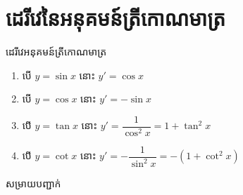 \documentclass[12pt,fleqn]{book} %
\newcommand{\solution}{{\begin{center}\kml \color{magenta} សម្រាយបញ្ជាក់\end{center} }}
\begin{document}
\section{ដេរីវេនៃអនុគមន៍ត្រីកោណមាត្រ}
\begin{property}
ដេរីវេអនុគមន៍ត្រីកោណមាត្រ
\begin{enumerate}
\item បើ $y=\sin x$ នោះ $y'=\cos x$ 
\item បើ $y=\cos x$ នោះ $y'=-\sin x$
\item បើ $y=\tan x$ នោះ $y'=\dfrac{1}{\cos^2 x}=1+\tan^2 x$
\item បើ $y=\cot x$ នោះ $y'=-\dfrac{1}{\sin^2 x}=-(1+\cot^2 x)$
\end{enumerate}
\end{property}
\solution
\end{document}
